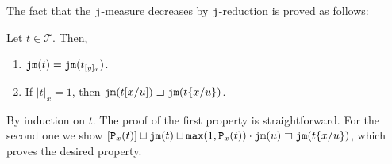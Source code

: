 \documentclass{LMCS}
\renewcommand{\>}{\rightarrow}
\newcommand{\isubs}[1]{ \{ #1  \} }
\newcommand{\multiset}[1]{ [ #1 ] }
\newcommand{\dis}{{\tt j}}
\newcommand{\mul}[2]{{\tt P}_{#2}(#1)}
\newcommand{\terms}{\mathcal{T}}
\newcommand{\dm}[1]{\dis {\tt m}(#1)}
\newcommand{\jop}{{\tt j}}
\newcommand{\maxi}[2]{{\tt max}(#1,#2)}
\newcommand{\gm}{\sqsupset}
\begin{document}
The fact that the $\jop$-measure decreases by $\dis$-reduction is proved as follows:

\begin{lem}
\label{l:properties-dm-for-terms}
Let $t \in \terms$. Then, 
\begin{enumerate}[\rm(1)]
\item \label{l:pdmt-1} $\dm{t} = \dm{t_{[y]_x}}$.
\item \label{l:pdmt-2} If $|t|_x =1$, then
$ \dm{t[x/u]} \gm  \dm{t\isubs{x/u}}$.
\end{enumerate}
\end{lem}

\proof By induction on $t$. The proof of the  first property is 
straightforward.
For the second one we show $\multiset{\mul{t}{x}} \sqcup \dm{t} \sqcup
\maxi{1}{\mul{t}{x}} \cdot \dm{u} \gm \dm{t\isubs{x/u}}$, which proves
the desired property.
\end{document}
